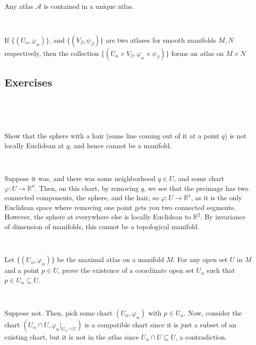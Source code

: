 \documentclass{article}
\begin{document}
\begin{proposition}
  \

  Any atlas $\mathcal{A}$ is contained in a unique atlas.
\end{proposition}

\begin{proposition}
  \

  If $\{(U_\alpha, \varphi_\alpha)\}$, and $\{(V_\beta, \psi_\beta)\}$ are two atlases for smooth manifolds $M, N$ respectively, then the collection $\{(U_\alpha \times V_\beta, \varphi_\alpha \times \psi_\beta)\}$ forms an atlas on $M \times N$
\end{proposition}

\subsection{Exercises}
\

\begin{exercise}[5.2]
  \

  Show that the sphere with a hair (some line coming out of it at a point $q$) is not locally Euclidean at $q$, and hence cannot be a manifold.
\end{exercise}

\begin{solution}
  \

  Suppose it was, and there was some neighborhood $q \in U$, and some chart $\varphi: U \to \mathbb{R}^n$. Then, on this chart, by removing $q$, we see that the preimage has two connected components, the sphere, and the hair, so $\varphi: U \to \mathbb{R}^1$, as it is the only Euclidean space where removing one point gets you two connected segments. However, the sphere at everywhere else is locally Euclidean to $\mathbb{R}^2$. By invariance of dimension of manifolds, this cannot be a topological manifold.
\end{solution}

\begin{exercise}[5.4]
  \

  Let $\{(U_\alpha, \varphi_\alpha)\}$ be the maximal atlas on a manifold $M$. For any open set $U$ in $M$ and a point $p \in U$, prove the existence of a coordinate open set $U_\alpha$ such that $p \in U_\alpha \subseteq U$.
\end{exercise}

\begin{solution}
  \

  Suppose not. Then, pick some chart $(U_\alpha, \varphi_\alpha)$ with $p \in U_\alpha$. Now, consider the chart $(U_\alpha \cap U, \varphi_\alpha \vert_{U_\alpha \cap U})$ is a compatible chart since it is just a subset of an existing chart, but it is not in the atlas since $U_\alpha \cap U \subseteq U$, a contradiction.
\end{solution}
\end{document}
